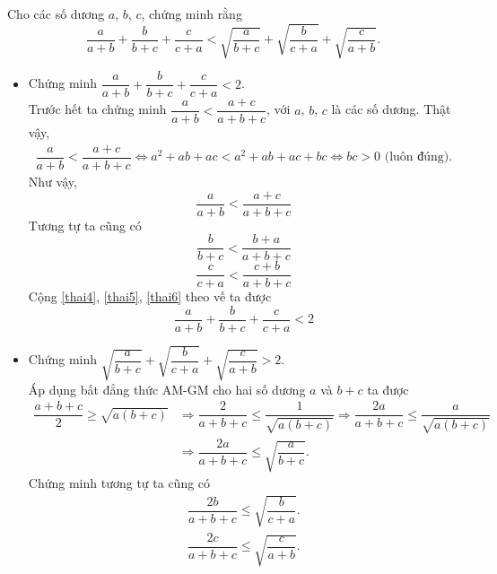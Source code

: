 \begin{ex}%
 Cho các số dương $a$, $b$, $c$, chứng minh rằng
 $$\dfrac{a}{a+b} + \dfrac{b}{b+c} + \dfrac{c}{c+a} < \sqrt{\dfrac{a}{b+c}} + \sqrt{\dfrac{b}{c+a}} + \sqrt{\dfrac{c}{a+b}}.$$
 \loigiai
  {
  \begin{itemize}
   \item Chứng minh $\dfrac{a}{a+b} + \dfrac{b}{b+c} + \dfrac{c}{c+a} < 2$.\\
   Trước hết ta chứng minh $\dfrac{a}{a+b}<\dfrac{a+c}{a+b+c}$, với $a$, $b$, $c$ là các số dương. Thật vậy,
   \begin{eqnarray*}
    \dfrac{a}{a+b}<\dfrac{a+c}{a+b+c} \Leftrightarrow a^2+ab+ac<a^2+ab+ac+bc \Leftrightarrow bc>0 \text{ (luôn đúng)}.
   \end{eqnarray*}
   Như vậy,
   \begin{equation}
    \dfrac{a}{a+b}<\dfrac{a+c}{a+b+c} \label{thai4}
   \end{equation}
   Tương tự ta cũng có
   \begin{equation}
    \dfrac{b}{b+c}<\dfrac{b+a}{a+b+c} \label{thai5}
   \end{equation}
   \begin{equation}
    \dfrac{c}{c+a}<\dfrac{c+b}{a+b+c} \label{thai6}
   \end{equation}
   Cộng \eqref{thai4}, \eqref{thai5}, \eqref{thai6} theo vế ta được
   \begin{equation}
    \dfrac{a}{a+b} + \dfrac{b}{b+c} + \dfrac{c}{c+a} < 2 \label{thai7}
   \end{equation}
   \item Chứng minh $\sqrt{\dfrac{a}{b+c}} + \sqrt{\dfrac{b}{c+a}} + \sqrt{\dfrac{c}{a+b}} > 2$.\\
   Áp dụng bất đẳng thức AM-GM cho hai số dương $a$ và $b+c$ ta được
   \begin{align}
    \dfrac{a+b+c}{2} \geq \sqrt{a(b+c)} & \Rightarrow \dfrac{2}{a+b+c} \leq \dfrac{1}{\sqrt{a(b+c)}} \Rightarrow \dfrac{2a}{a+b+c} \leq \dfrac{a}{\sqrt{a(b+c)}} \nonumber\\
    									& \Rightarrow \dfrac{2a}{a+b+c} \leq \sqrt{\dfrac{a}{b+c}}. \label{thai8}
   \end{align}
   Chứng minh tương tự ta cũng có
   \begin{align}
    \dfrac{2b}{a+b+c} \leq \sqrt{\dfrac{b}{c+a}}. \label{thai9}\\
    \dfrac{2c}{a+b+c} \leq \sqrt{\dfrac{c}{a+b}}. \label{thai10}

\end{align}
\end{itemize}}
\end{ex}
